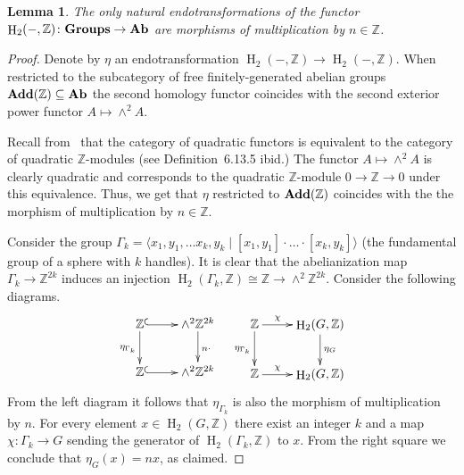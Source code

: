 \documentclass[oneside, 10pt]{amsart}
\theoremstyle{plain}
\numberwithin{equation}{section}
\newtheorem{lemma}{Lemma}
\numberwithin{lemma}{section}
\theoremstyle{remark}
\theoremstyle{definition}
\newcommand{\catname}[1]{{\normalfont\textbf{#1}}}
\DeclareMathOperator{\HH}{H}
\newcommand{\ZZ}{\mathbb{Z}}
\begin{document}
\begin{lemma} \label{lm:endotr} The only natural endotransformations of the functor $\HH_2(-, \ZZ)\colon \catname{Groups}\to \catname{Ab}$ 
 are morphisms of multiplication by $n \in \ZZ$.
\end{lemma}
\begin{proof}
 Denote by $\eta$ an endotransformation $\HH_2(-, \ZZ) \to \HH_2(-, \ZZ)$.
 When restricted to the subcategory of free finitely-generated abelian groups $\catname{Add}(\ZZ) \subseteq \catname{Ab}$ the second homology functor
 coincides with the second exterior power functor $A \mapsto \wedge^2A$. 
 
 Recall from~\cite[Theorem~6.13.12]{Ba96} that the category of quadratic functors is equivalent to the category of quadratic $\ZZ$-modules (see Definition~6.13.5 ibid.)
 The functor $A \mapsto \wedge^2A$ is clearly quadratic and corresponds to the quadratic $\ZZ$-module $0 \to \ZZ \to 0$ under this equivalence.
 Thus, we get that $\eta$ restricted to $\catname{Add}(\ZZ)$ coincides with the the morphism of multiplication by $n\in \ZZ$.
 
 Consider the group $\Gamma_k = \langle x_1, y_1, \ldots x_k, y_k \mid [x_1, y_1]\cdot \ldots \cdot [x_k, y_k] \rangle$ (the fundamental group of a sphere with $k$ handles).
 It is clear that the abelianization map $\Gamma_k \to \ZZ^{2k}$ induces an injection $\HH_2(\Gamma_k, \ZZ) \cong \ZZ \to \wedge^2\ZZ^{2k}$.  
 Consider the following diagrams.
  \[ \xymatrix{ \ZZ \ar@{^{(}->}[r] \ar[d]_{\eta_{\Gamma_k}} & \ar[d]^{n \cdot} \wedge^2\ZZ^{2k} \\
                \ZZ \ar@{^{(}->}[r]                          & \wedge^2\ZZ^{2k} } \ \ \ 
     \xymatrix{   \ZZ  \ar[r]^(.35){\chi} \ar[d]_{\eta_{\Gamma_k}} & \ar[d]^{\eta_G} \HH_2(G, \ZZ) \\
                  \ZZ  \ar[r]^(.35){\chi}                          & \HH_2(G, \ZZ)}  \]
 From the left diagram it follows that $\eta_{\Gamma_k}$ is also the morphism of multiplication by $n$.
 For every element $x\in \HH_2(G, \ZZ)$ there exist an integer $k$ and a map $\chi\colon \Gamma_k\to G$ sending the generator of $\HH_2(\Gamma_k, \ZZ)$ to $x$.
 From the right square we conclude that $\eta_G(x) = nx$, as claimed.
\end{proof}
\end{document}

